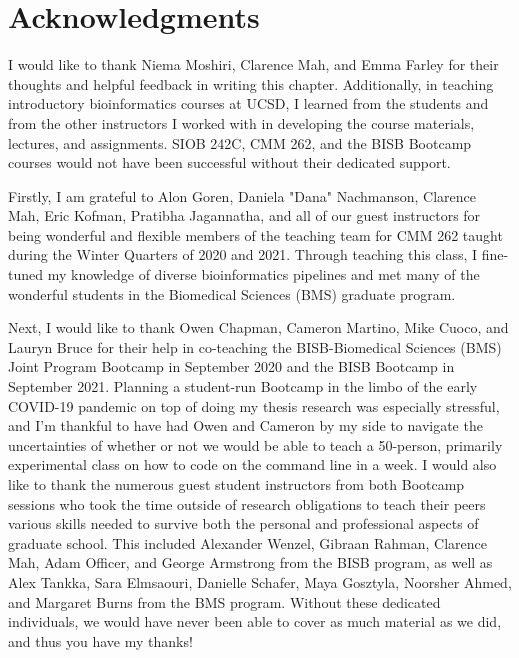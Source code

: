 \section{Acknowledgments}

I would like to thank Niema Moshiri, Clarence Mah, and Emma Farley for their thoughts and helpful feedback in writing this chapter. Additionally, in teaching introductory bioinformatics courses at UCSD, I learned from the students and from the other instructors I worked with in developing the course materials, lectures, and assignments. SIOB 242C, CMM 262, and the BISB Bootcamp courses would not have been successful without their dedicated support. 

Firstly, I am grateful to Alon Goren, Daniela "Dana" Nachmanson, Clarence Mah, Eric Kofman, Pratibha Jagannatha, and all of our guest instructors for being wonderful and flexible members of the teaching team for CMM 262 taught during the Winter Quarters of 2020 and 2021. Through teaching this class, I fine-tuned my knowledge of diverse bioinformatics pipelines and met many of the wonderful students in the Biomedical Sciences (BMS) graduate program. 

Next, I would like to thank Owen Chapman, Cameron Martino, Mike Cuoco, and Lauryn Bruce for their help in co-teaching the BISB-Biomedical Sciences (BMS) Joint Program Bootcamp in September 2020 and the BISB Bootcamp in September 2021. Planning a student-run Bootcamp in the limbo of the early COVID-19 pandemic on top of doing my thesis research was especially stressful, and I'm thankful to have had Owen and Cameron by my side to navigate the uncertainties of whether or not we would be able to teach a 50-person, primarily experimental class on how to code on the command line in a week. I would also like to thank the numerous guest student instructors from both Bootcamp sessions who took the time outside of research obligations to teach their peers various skills needed to survive both the personal and professional aspects of graduate school. This included Alexander Wenzel, Gibraan Rahman, Clarence Mah, Adam Officer, and George Armstrong from the BISB program, as well as Alex Tankka, Sara Elmsaouri, Danielle Schafer, Maya Gosztyla, Noorsher Ahmed, and Margaret Burns from the BMS program. Without these dedicated individuals, we would have never been able to cover as much material as we did, and thus you have my thanks! 

